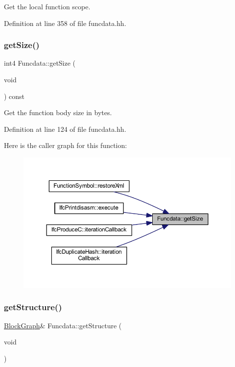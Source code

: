 Get the local function scope. 



Definition at line 358 of file funcdata.\+hh.

\mbox{\label{class_funcdata_a14a1dc8e5675b2d47d085f89c0b97df8}} 
\subsubsection{\texorpdfstring{getSize()}{getSize()}}
{\footnotesize\ttfamily int4 Funcdata\+::get\+Size (\begin{DoxyParamCaption}\item[{void}]{ }\end{DoxyParamCaption}) const\hspace{0.3cm}{\ttfamily [inline]}}



Get the function body size in bytes. 



Definition at line 124 of file funcdata.\+hh.

Here is the caller graph for this function\+:
\nopagebreak
\begin{figure}[H]
\begin{center}
\leavevmode
\includegraphics[width=350pt]{class_funcdata_a14a1dc8e5675b2d47d085f89c0b97df8_icgraph}
\end{center}
\end{figure}
\mbox{\label{class_funcdata_a8010b1f0044fd3a03f8f717279ffc0b1}} 
\subsubsection{\texorpdfstring{getStructure()}{getStructure()}\hspace{0.1cm}{\footnotesize\ttfamily [1/2]}}
{\footnotesize\ttfamily \mbox{\hyperlink{class_block_graph}{Block\+Graph}}\& Funcdata\+::get\+Structure (\begin{DoxyParamCaption}\item[{void}]{ }\end{DoxyParamCaption})\hspace{0.3cm}{\ttfamily [inline]}}



